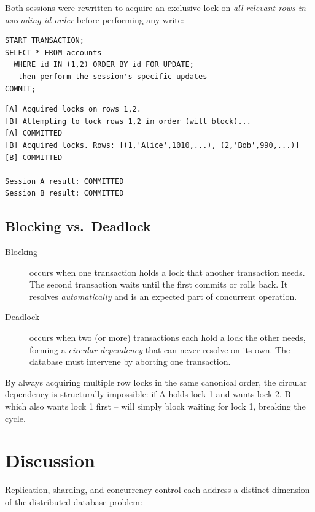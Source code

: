 \documentclass[12pt,a4paper]{article}
\begin{document}
Both sessions were rewritten to acquire an exclusive lock on \emph{all
relevant rows in ascending id order} before performing any write:

\begin{lstlisting}[style=sqlstyle, caption={Ordered lock acquisition in both sessions.}]
START TRANSACTION;
SELECT * FROM accounts
  WHERE id IN (1,2) ORDER BY id FOR UPDATE;
-- then perform the session's specific updates
COMMIT;
\end{lstlisting}

\begin{lstlisting}[style=bashstyle, caption={No deadlock -- Session B blocks, then commits.}]
[A] Acquired locks on rows 1,2.
[B] Attempting to lock rows 1,2 in order (will block)...
[A] COMMITTED
[B] Acquired locks. Rows: [(1,'Alice',1010,...), (2,'Bob',990,...)]
[B] COMMITTED

Session A result: COMMITTED
Session B result: COMMITTED
\end{lstlisting}

\subsection{Blocking vs.\ Deadlock}

\begin{description}
  \item[Blocking] occurs when one transaction holds a lock that another
    transaction needs.  The second transaction waits until the first commits or
    rolls back.  It resolves \emph{automatically} and is an expected part of
    concurrent operation.
  \item[Deadlock] occurs when two (or more) transactions each hold a lock the
    other needs, forming a \emph{circular dependency} that can never resolve on
    its own.  The database must intervene by aborting one transaction.
\end{description}

By always acquiring multiple row locks in the same canonical order, the
circular dependency is structurally impossible: if A holds lock 1 and wants
lock 2, B -- which also wants lock 1 first -- will simply block waiting for
lock 1, breaking the cycle.

\section{Discussion}

Replication, sharding, and concurrency control each address a distinct
dimension of the distributed-database problem:
\end{document}
